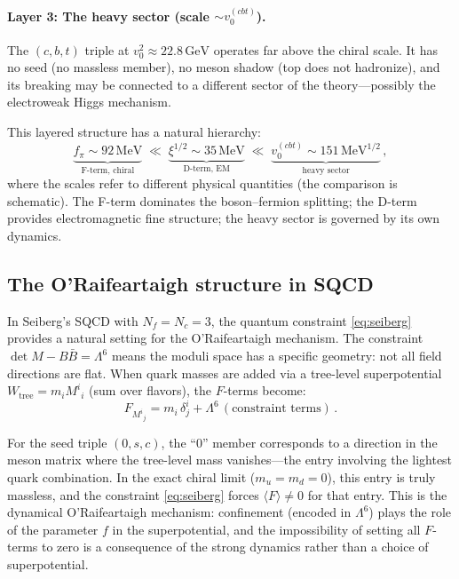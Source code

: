 \documentclass[12pt,a4paper]{article}
\newcommand{\MeV}{\,\text{MeV}}
\newcommand{\GeV}{\,\text{GeV}}
\begin{document}
\paragraph{Layer 3: The heavy sector (scale $\sim v_0^{(cbt)}$).}
The $(c,b,t)$ triple at $v_0^2 \approx 22.8\GeV$ operates far 
above the chiral scale. It has no seed (no massless member), no 
meson shadow (top does not hadronize), and its breaking may be 
connected to a different sector of the theory---possibly the 
electroweak Higgs mechanism.

This layered structure has a natural hierarchy:
\begin{equation}
\underbrace{f_\pi \sim 92\MeV}_{\text{F-term, chiral}} 
\;\ll\; 
\underbrace{\xi^{1/2} \sim 35\MeV}_{\text{D-term, EM}} 
\;\ll\; 
\underbrace{v_0^{(cbt)} \sim 151\MeV^{1/2}}_{\text{heavy sector}}\,,
\end{equation}
where the scales refer to different physical quantities (the 
comparison is schematic). The F-term dominates the boson--fermion 
splitting; the D-term provides electromagnetic fine structure; the 
heavy sector is governed by its own dynamics.

\subsection{The O'Raifeartaigh structure in SQCD}

In Seiberg's SQCD with $N_f = N_c = 3$, the quantum constraint 
\eqref{eq:seiberg} provides a natural setting for the 
O'Raifeartaigh mechanism. The constraint $\det M - B\bar{B} = \Lambda^6$ 
means the moduli space has a specific geometry: not all field directions 
are flat. When quark masses are added via a tree-level superpotential 
$W_{\text{tree}} = m_i M^i{}_i$ (sum over flavors), the $F$-terms become:
\begin{equation}
F_{M^i{}_j} = m_i\,\delta^i_j + \Lambda^6\,(\text{constraint terms})\,.
\end{equation}

For the seed triple $(0, s, c)$, the ``$0$'' member corresponds to a 
direction in the meson matrix where the tree-level mass vanishes---the 
entry involving the lightest quark combination. In the exact chiral 
limit ($m_u = m_d = 0$), this entry is truly massless, and the 
constraint \eqref{eq:seiberg} forces $\langle F\rangle \neq 0$ for 
that entry. This is the dynamical O'Raifeartaigh mechanism: 
confinement (encoded in $\Lambda^6$) plays the role of the parameter 
$f$ in the superpotential, and the impossibility of setting all 
$F$-terms to zero is a consequence of the strong dynamics rather 
than a choice of superpotential.
\end{document}
